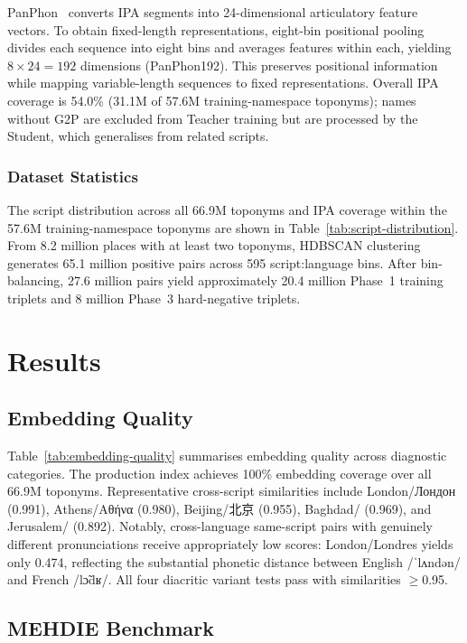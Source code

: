 \documentclass[11pt,a4paper]{article}
\newcommand{\textar}[1]{{\arabicfont\RL{#1}}}
\newcommand{\textcn}[1]{{\chinesefont #1}}
\newcommand{\texthebrew}[1]{{\hebrewfont\RL{#1}}}
\begin{document}
PanPhon~\citep{mortensen2016} converts IPA segments into 24-dimensional articulatory feature vectors. To obtain fixed-length representations, eight-bin positional pooling divides each sequence into eight bins and averages features within each, yielding $8 \times 24 = 192$ dimensions (PanPhon192). This preserves positional information while mapping variable-length sequences to fixed representations. Overall IPA coverage is 54.0\% (31.1M of 57.6M training-namespace toponyms); names without G2P are excluded from Teacher training but are processed by the Student, which generalises from related scripts.

\subsubsection{Dataset Statistics}

The script distribution across all 66.9M toponyms and IPA coverage within the 57.6M training-namespace toponyms are shown in Table~\ref{tab:script-distribution}. From 8.2 million places with at least two toponyms, HDBSCAN clustering generates 65.1 million positive pairs across 595 script:language bins. After bin-balancing, 27.6 million pairs yield approximately 20.4 million Phase~1 training triplets and 8 million Phase~3 hard-negative triplets.


\section{Results}
\label{sec:results}

\subsection{Embedding Quality}

Table~\ref{tab:embedding-quality} summarises embedding quality across diagnostic categories. The production index achieves 100\% embedding coverage over all 66.9M toponyms. Representative cross-script similarities include London/Лондон (0.991), Athens/Αθήνα (0.980), Beijing/\textcn{北京} (0.955), Baghdad/\textar{بغداد} (0.969), and Jerusalem/\texthebrew{ירושלים} (0.892). Notably, cross-language same-script pairs with genuinely different pronunciations receive appropriately low scores: London/Londres yields only 0.474, reflecting the substantial phonetic distance between English /ˈlʌndən/ and French /lɔ̃dʁ/. All four diacritic variant tests pass with similarities $\geq$0.95.

\subsection{MEHDIE Benchmark}
\end{document}
